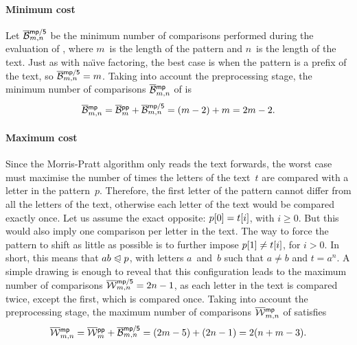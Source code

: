 \paragraph{Minimum cost}

Let
\(\smash[t]{\OB{\fun{mp/5}}{m,n}}\)
be the minimum number of comparisons performed during the evaluation
of , where \(m\)~is the length of the pattern and \(n\)~is
the length of the text. Just as with na\"{\i}ve factoring, the best
case is when the pattern is a prefix of the text, so
\(\OB{\fun{mp/5}}{m,n} = m\). Taking into account the preprocessing
stage, the minimum number of comparisons
\(\OB{\fun{mp}}{m,n}\) of
 is
\begin{equation*}
\belowdisplayskip=0pt
\OB{\fun{mp}}{m,n} = \OB{\fun{pp}}{m} + \OB{\fun{mp/5}}{m,n} = (m-2)
+ m = 2m - 2.
\end{equation*}

\vspace*{-10pt}

\paragraph{Maximum cost}

Since the Morris\hyp{}Pratt algorithm only reads the text forwards,
the worst case must maximise the number of times the letters of the
text~\(t\) are compared with a letter in the pattern~\(p\). Therefore,
the first letter of the pattern cannot differ from all the letters of
the text, otherwise each letter of the text would be compared exactly
once. Let us assume the exact opposite: \({p}[{0}] = {t}[{i}]\),
with \(i \geqslant 0\). But this would also imply one comparison per
letter in the text. The way to force the pattern to shift as little as
possible is to further impose \({p}[{1}] \neq {t}[{i}]\), for
\(i>0\). In short, this means that \(ab \mathrel{\trianglelefteqslant} p\), with letters
\(a\)~and~\(b\) such that \(a \neq b\) and \(t=a^n\). A simple
drawing is enough to reveal that this configuration leads to the
maximum number of comparisons \(\OW{\fun{mp/5}}{m,n} = 2n -
1\), as each letter in the text is
compared twice, except the first, which is compared once. Taking into
account the preprocessing stage, the maximum number of comparisons
\(\OW{\fun{mp}}{m,n}\)  of
 satisfies
\begin{equation*}
\belowdisplayskip=0pt
\OW{\fun{mp}}{m,n} = \OW{\fun{pp}}{m} + \OB{\fun{mp/5}}{m,n} = (2m-5)
+ (2n-1) = 2(n + m - 3).
\end{equation*}

